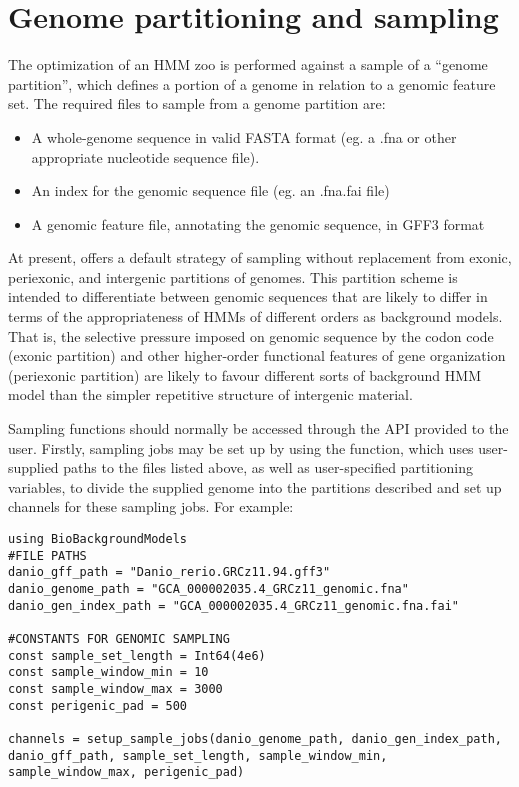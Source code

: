 \section{Genome partitioning and sampling}
The optimization of an HMM zoo is performed against a sample of a ``genome partition'', which defines a portion of a genome in relation to a genomic feature set. The required files to sample from a genome partition are:

\begin{itemize}
    \item A whole-genome sequence in valid FASTA format (eg. a .fna or other appropriate nucleotide sequence file).
    \item An index for the genomic sequence file (eg. an .fna.fai file)
    \item A genomic feature file, annotating the genomic sequence, in GFF3 format
\end{itemize}

At present,  offers a default strategy of sampling without replacement from exonic, periexonic, and intergenic partitions of genomes. This partition scheme is intended to differentiate between genomic sequences that are likely to differ in terms of the appropriateness of HMMs of different orders as background models. That is, the selective pressure imposed on genomic sequence by the codon code (exonic partition) and other higher-order functional features of gene organization (periexonic partition) are likely to favour different sorts of background HMM model than the simpler repetitive structure of intergenic material.

Sampling functions should normally be accessed through the API provided to the user. Firstly, sampling jobs may be set up by using the  function, which uses user-supplied paths to the files listed above, as well as user-specified partitioning variables, to divide the supplied genome into the partitions described and set up channels for these sampling jobs. For example:

\begin{verbatim}
using BioBackgroundModels
#FILE PATHS
danio_gff_path = "Danio_rerio.GRCz11.94.gff3"
danio_genome_path = "GCA_000002035.4_GRCz11_genomic.fna"
danio_gen_index_path = "GCA_000002035.4_GRCz11_genomic.fna.fai"

#CONSTANTS FOR GENOMIC SAMPLING
const sample_set_length = Int64(4e6)
const sample_window_min = 10
const sample_window_max = 3000
const perigenic_pad = 500

channels = setup_sample_jobs(danio_genome_path, danio_gen_index_path, danio_gff_path, sample_set_length, sample_window_min, sample_window_max, perigenic_pad)
\end{verbatim}

